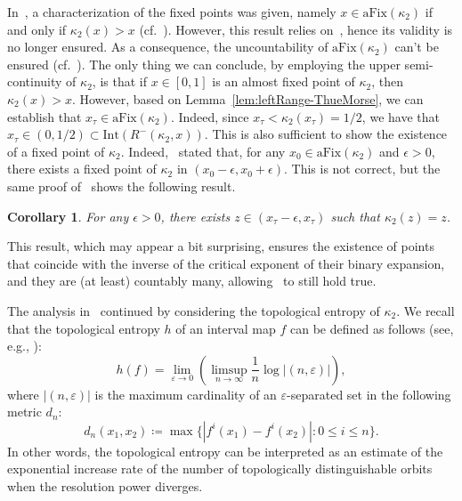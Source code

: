 \documentclass[12pt]{article}
\theoremstyle{plain}\newtheorem{teo}{Theorem}
\theoremstyle{plain}\newtheorem{proposition}[teo]{Proposition}
\theoremstyle{plain}\newtheorem{lemma}[teo]{Lemma}
\theoremstyle{plain}\newtheorem{corollary}[teo]{Corollary}
\theoremstyle{plain}\newtheorem{conjecture}[teo]{Conjecture}
\theoremstyle{definition}\newtheorem{definition}[teo]{Definition}
\theoremstyle{remark}\newtheorem{remark}[teo]{Remark}
\theoremstyle{definition}\newtheorem{example}[teo]{Example}
\numberwithin{teo}{section}
\numberwithin{equation}{section}
\begin{document}
In~\cite{Critical}, a characterization of the fixed points was given,
namely $x \in \mathrm{aFix}(\kappa_2)$ if and only if $\kappa_2(x) > x$
(cf.~\cite[Corollary 24]{Critical}).
However, this result relies on~\cite[Proposition 19]{Critical},
hence its validity is no longer ensured.
As a consequence, the uncountability of $\mathrm{aFix}(\kappa_2)$
can't be ensured (cf.~\cite[Corollary 25]{Critical}).
The only thing we can conclude,
by employing the upper semi-continuity of $\kappa_2$,
is that if $x\in [0,1]$ is an almost fixed point of $\kappa_2$,
then $\kappa_2(x) > x$.
However, based on Lemma~\ref{lem:leftRange-ThueMorse},
we can establish that $x_\tau \in \mathrm{aFix}(\kappa_2)$.
Indeed, since $x_\tau < \kappa_2(x_\tau) = 1/2$,
we have that
$x_\tau \in (0,1/2) \subset \mathrm{Int}(R^-(\kappa_2,x))$.
This is also sufficient to show 
the existence of a fixed point of $\kappa_2$.
Indeed,~\cite[Corollary 26]{Critical}
stated that, for any $x_0 \in \mathrm{aFix}(\kappa_2)$
and $\epsilon > 0$, there exists a fixed point of $\kappa_2$
in $(x_0 - \epsilon,x_0 + \epsilon)$.
This is not correct, 
but the same proof of~\cite[Corollary 26]{Critical}
shows the following result.
\begin{corollary}
	\label{cor:fixedPoint}
	For any $\epsilon > 0$, there exists $z \in (x_\tau -\epsilon,x_\tau)$
	such that $\kappa_2(z) = z$.
\end{corollary}
This result, which may appear a bit surprising, ensures the existence of
points that coincide with the inverse 
of the critical exponent of their binary expansion,
and they are (at least) countably many,
allowing~\cite[Corollary 27]{Critical} to still hold true.

\bigskip
The analysis in~\cite{Critical} continued
by considering the topological entropy of $\kappa_2$.
We recall that the topological entropy $h$ of an interval map $f$ can be
defined as follows
(see, e.g., \cite{bowen1971entropy,dinaburg1970correlation}):
\begin{equation}
	h(f)=\lim_{\varepsilon \to 0} \left( \limsup_{n \to \infty}  \frac{1}{n} \log \left| (n,\varepsilon) \right| \right),
	\label{entropy_}
\end{equation}
where $\left| (n,\varepsilon) \right|$ is
the maximum cardinality of an $\varepsilon$-separated set
in the following metric $d_n$:
\begin{equation} \label{N_metric}
	d_n(x_1,x_2) \coloneqq
	\max\big\{\left| f^i(x_1)-f^i(x_2)\right| : 0\le i \le n\big\}.
\end{equation}
In other words, the topological entropy can be interpreted as an estimate of the exponential increase rate of the number of topologically distinguishable orbits
when the resolution power diverges.
\end{document}
